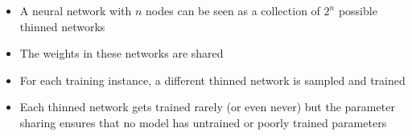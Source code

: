 \documentclass[serif,aspectratio=169]{beamer}
\begin{document}
\begin{frame}
	\begin{itemize}
		\justifying
		\item<2-> A neural network with $n$ nodes can be seen as a collection of $2^n$ possible thinned networks
		\item<3-> The weights in these networks are shared
		\item<4-> For each training instance, a different thinned network is sampled and trained
		\item<5-> Each thinned network gets trained rarely (or even never) but the parameter sharing ensures that no model has untrained or poorly trained parameters
	\end{itemize}
							
\end{frame}
					
\end{document}
